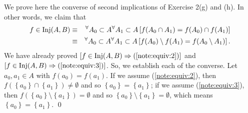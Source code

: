 \documentclass[a4paper,12pt]{article}
\begin{document}
\begin{rem}
	We prove here the converse of second implications of Exercise 2(g) and (h).
	In other words, we claim that 
	\begin{eqnarray}
		f \in \mathrm{Inj}(A,B)
		&\equiv&
		{}^{\forall} A_0 \subset A
		{}^{\forall} A_1 \subset A
		\left[ f(A_0 \cap A_1) = f(A_0) \cap f(A_1) \right]\label{note:equiv:2}\\
		&\equiv&
		{}^{\forall} A_0 \subset A
		{}^{\forall} A_1 \subset A
		\left[ f(A_0)\setminus f(A_1) = f(A_0 \setminus A_1) \right]\label{note:equiv:3}.
	\end{eqnarray}
	We have already proved
	\( \left[ f \in \mathrm{Inj}(A,B) \Rightarrow (\ref{note:equiv:2})\right] \)
	and
	\( \left[ f \in \mathrm{Inj}(A,B) \Rightarrow (\ref{note:equiv:3})\right] \).
	So, we establish each of the converse.
	Let
	\( a_0,a_1 \in A \)
	with
	\( f(a_0) = f(a_1) \).
	If we assume (\ref{note:equiv:2}),
	then
	\( f(\left\{ a_0 \right\} \cap \left\{ a_1 \right\}) \neq \emptyset \)
	and so
	\( \left\{ a_0 \right\} = \left\{ a_1 \right\} \);
	if we assume (\ref{note:equiv:3}),
	then
	\( f(\left\{ a_0 \right\} \setminus \left\{ a_1 \right\}) = \emptyset \)
	and so
	\( \left\{ a_0 \right\} \setminus \left\{ a_1 \right\} = \emptyset \),
	which means
	\( \left\{ a_0 \right\} = \left\{ a_1 \right\} \).
	\qed\end{rem}
\end{document}
